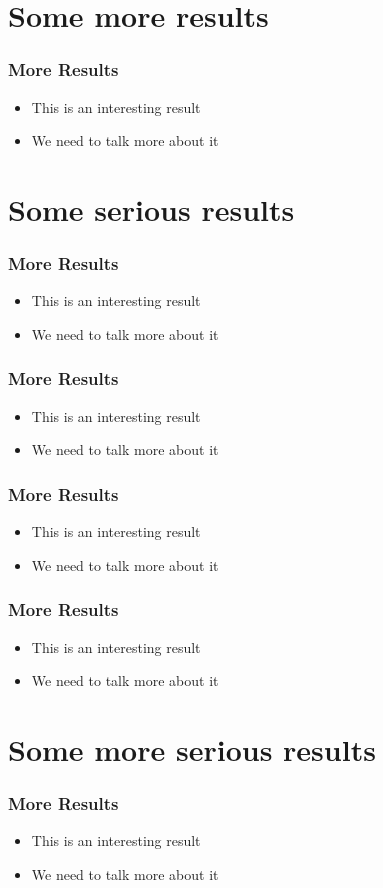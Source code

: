 \documentclass[10pt,xcolor=table]{beamer}
\begin{document}
\section{Some more results}
\begin{frame}
  \frametitle{More Results}
  \begin{itemize}
  \item This is an interesting result
  \item We need to talk more about it
  \end{itemize}
\end{frame}

\section{Some serious results}
\begin{frame}
  \frametitle{More Results}
  \begin{itemize}
  \item This is an interesting result
  \item We need to talk more about it
  \end{itemize}
\end{frame}

\begin{frame}
  \frametitle{More Results}
  \begin{itemize}
  \item This is an interesting result
  \item We need to talk more about it
  \end{itemize}
\end{frame}
\begin{frame}
  \frametitle{More Results}
  \begin{itemize}
  \item This is an interesting result
  \item We need to talk more about it
  \end{itemize}
\end{frame}
\begin{frame}
  \frametitle{More Results}
  \begin{itemize}
  \item This is an interesting result
  \item We need to talk more about it
  \end{itemize}
\end{frame}
\section{Some more serious results}
\begin{frame}
  \frametitle{More Results}
  \begin{itemize}
  \item This is an interesting result
  \item We need to talk more about it
  \end{itemize}
\end{frame}
\end{document}
